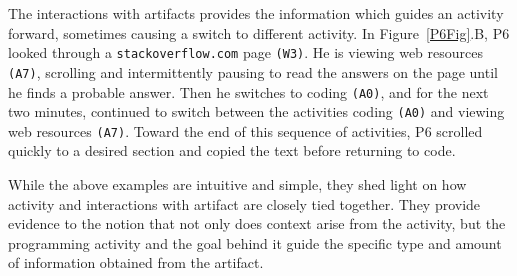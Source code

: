 The interactions with artifacts provides the information which guides an activity forward, sometimes causing a switch to different activity. In Figure~\ref{P6Fig}.B, P6 looked through a \texttt{stackoverflow.com} page \texttt{(W3)}. He is viewing web resources \texttt{(A7)}, scrolling and intermittently pausing to read the answers on the page until he finds a probable answer. Then he switches to coding \texttt{(A0)}, and for the next two minutes, continued to switch between the activities coding \texttt{(A0)} and viewing web resources \texttt{(A7)}. Toward the end of this sequence of activities, P6 scrolled quickly to a desired section and copied the text before returning to code.


While the above examples are intuitive and simple, they shed light on how activity and interactions with artifact are closely tied together. They provide evidence to the notion that not only does context arise from the activity, but the programming activity and the goal behind it guide the specific type and amount of information obtained from the artifact. 








